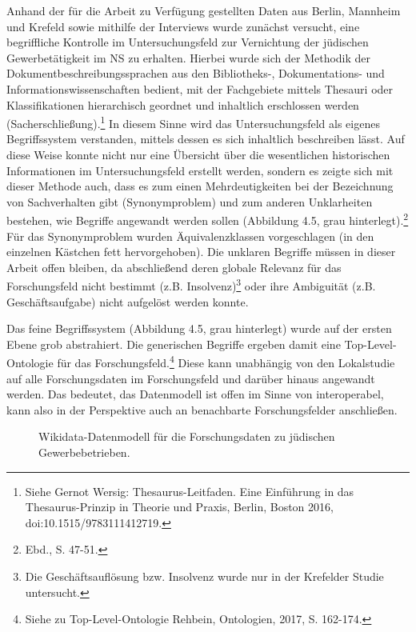 Anhand der für die Arbeit zu Verfügung gestellten Daten aus Berlin, Mannheim und Krefeld sowie mithilfe der Interviews wurde zunächst versucht, eine begriffliche Kontrolle im Untersuchungsfeld zur Vernichtung der jüdischen Gewerbetätigkeit im NS zu erhalten. Hierbei wurde sich der Methodik der Dokumentbeschreibungssprachen aus den Bibliotheks-, Dokumentations- und Informationswissenschaften bedient, mit der Fachgebiete mittels Thesauri oder Klassifikationen hierarchisch geordnet und inhaltlich erschlossen werden (Sacherschließung).\footnote{Siehe Gernot Wersig: Thesaurus-Leitfaden. Eine Einführung in das Thesaurus-Prinzip in Theorie und Praxis, Berlin, Boston 2016, doi:10.1515/9783111412719.} In diesem Sinne wird das Untersuchungsfeld als eigenes Begriffssystem verstanden, mittels dessen es sich inhaltlich beschreiben lässt. Auf diese Weise konnte nicht nur eine Übersicht über die wesentlichen historischen Informationen im Untersuchungsfeld erstellt werden, sondern es zeigte sich mit dieser Methode auch, dass es zum einen Mehrdeutigkeiten bei der Bezeichnung von Sachverhalten gibt (Synonymproblem) und zum anderen Unklarheiten bestehen, wie Begriffe angewandt werden sollen (Abbildung 4.5, grau hinterlegt).\footnote{Ebd., S. 47-51.} Für das Synonymproblem wurden Äquivalenzklassen vorgeschlagen (in den einzelnen Kästchen fett hervorgehoben). Die unklaren Begriffe müssen in dieser Arbeit offen bleiben, da abschließend deren globale Relevanz für das Forschungsfeld nicht bestimmt (z.B. Insolvenz)\footnote{Die Geschäftsauflösung bzw. Insolvenz wurde nur in der Krefelder Studie untersucht.} oder ihre Ambiguität (z.B. Geschäftsaufgabe) nicht aufgelöst werden konnte. 



Das feine Begriffssystem (Abbildung 4.5, grau hinterlegt) wurde auf der ersten Ebene grob abstrahiert. Die generischen Begriffe ergeben damit eine Top-Level-Ontologie für das Forschungsfeld.\footnote{Siehe zu Top-Level-Ontologie Rehbein, Ontologien, 2017, S. 162-174.} Diese kann unabhängig von den Lokalstudie auf alle Forschungsdaten im Forschungsfeld und darüber hinaus angewandt werden. Das bedeutet, das Datenmodell ist offen im Sinne von interoperabel, kann also in der Perspektive auch an benachbarte Forschungsfelder anschließen.



    

\begin{figure}[h]
    \centering
    \caption{Wikidata-Datenmodell für die Forschungsdaten zu jüdischen Gewerbebetrieben.}
    \label{fig:x cubed graph}
\end{figure}




